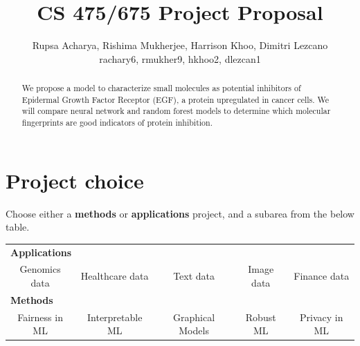 \documentclass{article}
\title{CS 475/675 Project Proposal}
\author{
  Rupsa Acharya, Rishima Mukherjee, Harrison Khoo, Dimitri Lezcano\\
  rachary6, rmukher9, hkhoo2, dlezcan1
}
\newcommand{\Checked}{{\LARGE \XBox}}%
\newcommand{\Unchecked}{{\LARGE \Square}}%
\begin{document}
\maketitle

\begin{abstract}
We propose a model to characterize small molecules as potential inhibitors of Epidermal Growth Factor Receptor (EGF), a protein upregulated in cancer cells. We will compare neural network and random forest models to determine which molecular fingerprints are good indicators of protein inhibition.
\end{abstract}

\section{Project choice}

Choose either a {\bf methods} or {\bf applications} project, and a subarea from the below table.
\begin{table}[!h]
\centering
\def\arraystretch{2}
\begin{tabular}{c c c c c }
\toprule
\multicolumn{5}{l}{\Checked \bf Applications} \\
\Checked Genomics data & 
\Unchecked Healthcare data & 
\Unchecked Text data &
\Unchecked Image data &
\Unchecked Finance data \\
\midrule
\multicolumn{5}{l}{\Unchecked \bf Methods} \\
\Unchecked Fairness in ML &
\Unchecked Interpretable ML &
\Unchecked Graphical Models &
\Unchecked Robust ML &
\Unchecked Privacy in ML \\
\bottomrule
\end{tabular}
\end{table}
\end{document}
